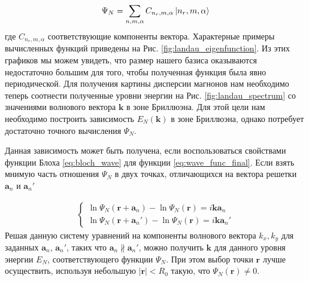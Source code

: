 \documentclass[a4paper,article,14pt]{extarticle}
\begin{document}
\begin{equation}
\label{eq:wave_func_final}
\Psi_N = \sum_{n,m,\alpha} C_{n_r, m, \alpha} \ket{n_r, m, \alpha}
\end{equation}
где $C_{n_r, m, \alpha}$ соответствующие компоненты вектора.
Характерные примеры вычисленных функций приведены на Рис. \ref{fig:landau_eigenfunction}. Из этих графиков мы можем увидеть, что размер нашего базиса оказываются недостаточно большим для того, чтобы полученная функция была явно периодической. Для получения картины дисперсии магнонов\cite{garst_2017, roldan} нам необходимо теперь соотнести полученные уровни энергии на Рис. \ref{fig:landau_spectrum}  со значениями волнового вектора $\mathbf{k}$ в зоне Бриллюэна. Для этой цели нам необходимо построить зависимость $E_N(\mathbf{k})$ в зоне Бриллюэна, однако потребует достаточно точного вычисления $\Psi_N$.

Данная зависимость может быть получена, если воспользоваться свойствами функции Блоха \eqref{eq:bloch_wave} для функции \eqref{eq:wave_func_final}. Если взять мнимую часть отношения $\Psi_N$ в двух точках, отличающихся на вектора решетки $\mathbf{a}_n$ и $\mathbf{a}_n'$

\begin{equation}
\begin{aligned}
\begin{cases}
	\ln{ \Psi_N(\mathbf{r} + \mathbf{a}_n) } -  \ln{\Psi_N(\mathbf{r})} = i \mathbf{k} \mathbf{a}_n \\
	\ln{ \Psi_N(\mathbf{r} + \mathbf{a}_n') } -  \ln{\Psi_N(\mathbf{r})}  = i \mathbf{k} \mathbf{a}_n'
\end{cases}
\end{aligned}
\end{equation}
Решая данную систему уравнений на компоненты волнового вектора $k_x,k_y$ для заданных $\mathbf{a}_n$, $\mathbf{a}_n'$, таких что $\mathbf{a}_n \nparallel \mathbf{a}_n'$, можно получить $\mathbf{k}$ для данного уровня энергии $E_N$, соответствующего функции $\Psi_N$. При этом выбор точки $\mathbf{r}$ лучше осуществить, используя небольшую $|\mathbf{r}|<R_0$ такую, что $\Psi_N(\mathbf{r}) \neq 0$.
\end{document}
